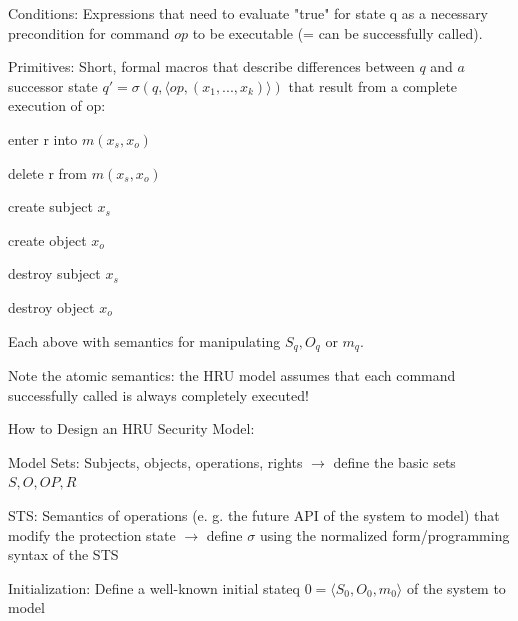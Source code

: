 \documentclass[a4paper]{article}
\begin{document}
\begin{multicols}{3}
    Conditions: Expressions that need to evaluate "true" for state q as a necessary precondition for command $op$ to be executable (= can be successfully called).

    Primitives: Short, formal macros that describe differences between $q$ and $a$ successor state $q'=\sigma(q,\langle op,(x_1 ,...,x_k)\rangle )$ that result from a complete execution of op:
    \begin{itemize*}
        \item enter r into $m(x_s,x_o)$
        \item delete r from $m(x_s,x_o)$
        \item create subject $x_s$
        \item create object $x_o$
        \item destroy subject $x_s$
        \item destroy object $x_o$
        \item Each above with semantics for manipulating $S_q, O_q$ or $m_q$.
    \end{itemize*}

    Note the atomic semantics: the HRU model assumes that each command successfully called is always completely executed!

    How to Design an HRU Security Model:
    \begin{enumerate*}
        \item  Model Sets: Subjects, objects, operations, rights $\rightarrow$  define the basic sets $S,O,OP,R$
        \item STS: Semantics of operations (e. g. the future API of the system to model) that modify the protection state $\rightarrow$  define $\sigma$ using the normalized form/programming syntax of the STS
        \item Initialization: Define a well-known initial stateq $0 =\langle S_0 ,O_0 ,m_0 \rangle$ of the system to model
    \end{enumerate*}


\end{multicols}
\end{document}
